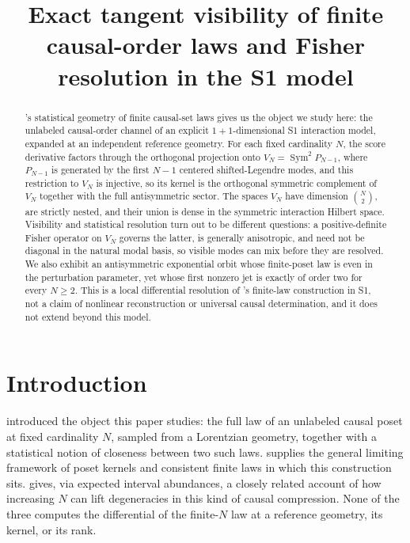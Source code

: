 \documentclass[11pt]{article}
\title{Exact tangent visibility of finite causal-order laws and Fisher resolution in the S1 model}
\author{}
\date{}
\begin{document}
\maketitle

\begin{abstract}
\citet{Bombelli2000}'s statistical geometry of finite causal-set laws gives us the object we study here: the unlabeled causal-order channel of an explicit $1+1$-dimensional S1 interaction model, expanded at an independent reference geometry. For each fixed cardinality $N$, the score derivative factors through the orthogonal projection onto $V_N=\operatorname{Sym}^2P_{N-1}$, where $P_{N-1}$ is generated by the first $N-1$ centered shifted-Legendre modes, and this restriction to $V_N$ is injective, so its kernel is the orthogonal symmetric complement of $V_N$ together with the full antisymmetric sector. The spaces $V_N$ have dimension $\binom N2$, are strictly nested, and their union is dense in the symmetric interaction Hilbert space. Visibility and statistical resolution turn out to be different questions: a positive-definite Fisher operator on $V_N$ governs the latter, is generally anisotropic, and need not be diagonal in the natural modal basis, so visible modes can mix before they are resolved. We also exhibit an antisymmetric exponential orbit whose finite-poset law is even in the perturbation parameter, yet whose first nonzero jet is exactly of order two for every $N\ge2$. This is a local differential resolution of \citet{Bombelli2000}'s finite-law construction in S1, not a claim of nonlinear reconstruction or universal causal determination, and it does not extend beyond this model.
\end{abstract}


\section{Introduction}

\citet{Bombelli2000} introduced the object this paper studies: the full law of an unlabeled causal poset at fixed cardinality $N$, sampled from a Lorentzian geometry, together with a statistical notion of closeness between two such laws. \citet{Janson2011} supplies the general limiting framework of poset kernels and consistent finite laws in which this construction sits. \citet{Surya2026} gives, via expected interval abundances, a closely related account of how increasing $N$ can lift degeneracies in this kind of causal compression. None of the three computes the differential of the finite-$N$ law at a reference geometry, its kernel, or its rank.
\end{document}
